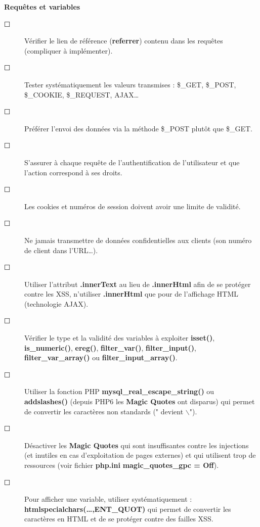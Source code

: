 \documentclass[a4paper,11pt]{article}				    %
\begin{document}
{\textbf{Requ\^etes et variables}
\begin{description}
   \item[$\Square$] V\'erifier le lien de r\'ef\'erence (\textbf{referrer}) contenu dans les requ\^etes (compliquer \`a impl\'ementer).\vskip-0.1cm
   \item[$\Square$] Tester syst\'ematiquement les valeurs transmises : {\footnotesize\$\_GET, \$\_POST, \$\_COOKIE, \$\_REQUEST, AJAX\dots{}}\vskip-0.1cm
   \item[$\Square$] Pr\'ef\'erer l'envoi des donn\'ees via la m\'ethode \$\_POST plut\^ot que \$\_GET.\vskip-0.1cm
   \item[$\Square$] S'assurer \`a chaque requ\^ete de l'authentification de l'utilisateur et que l'action correspond \`a ses droits.\vskip-0.1cm
   \item[$\Square$] Les cookies et num\'eros de session doivent avoir une limite de validit\'e.\vskip-0.1cm
	\item[$\Square$] Ne jamais transmettre de donn\'ees confidentielles aux clients (son num\'ero de client dans l'URL\dots{}).\vskip-0.1cm
	\item[$\Square$] Utiliser l'attribut \textbf{.innerText} au lieu de \textbf{.innerHtml} afin de se prot\'eger contre les XSS, n'utiliser \textbf{.innerHtml} que pour de l'affichage HTML (technologie AJAX).
   \item[$\Square$] V\'erifier le type et la validit\'e des variables \`a exploiter \textbf{isset()}, \textbf{is\_numeric()}, \textbf{ereg()},  \textbf{filter\_var()}, \textbf{filter\_input()}, \textbf{filter\_var\_array()} ou \textbf{filter\_input\_array()}.
   \item[$\Square$] Utiliser la fonction PHP \textbf{mysql\_real\_escape\_string()} ou \textbf{addslashes()} (depuis PHP6 les \textbf{Magic Quotes} ont disparus) qui permet de convertir les caract\`eres non standards (" devient $\backslash$").
   \item[$\Square$] D\'esactiver les \textbf{Magic Quotes} qui sont insuffisantes contre les injections (et inutiles en cas d'exploitation de pages externes) et qui utilisent trop de ressources (voir fichier \textbf{php.ini} \textbf{magic\_quotes\_gpc = Off}).
   \item[$\Square$] Pour afficher une variable, utiliser syst\'ematiquement : \textbf{htmlspecialchars(\dots{},ENT\_QUOT)} qui permet de convertir les caract\`eres en HTML et de se prot\'eger contre des failles XSS.

\end{description}}
\end{document}
